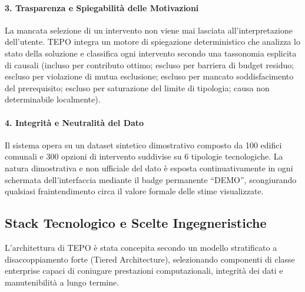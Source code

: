 \paragraph{3. Trasparenza e Spiegabilità delle Motivazioni}
La mancata selezione di un intervento non viene mai lasciata all'interpretazione dell'utente. TEPO integra un motore di spiegazione deterministico che analizza lo stato della soluzione e classifica ogni intervento secondo una tassonomia esplicita di causali (incluso per contributo ottimo; escluso per barriera di budget residuo; escluso per violazione di mutua esclusione; escluso per mancato soddisfacimento del prerequisito; escluso per saturazione del limite di tipologia; causa non determinabile localmente).

\paragraph{4. Integrità e Neutralità del Dato}
Il sistema opera su un dataset sintetico dimostrativo composto da 100 edifici comunali e 300 opzioni di intervento suddivise su 6 tipologie tecnologiche. La natura dimostrativa e non ufficiale del dato è esposta continuativamente in ogni schermata dell'interfaccia mediante il badge permanente ``DEMO'', scongiurando qualsiasi fraintendimento circa il valore formale delle stime visualizzate.

\subsection{Stack Tecnologico e Scelte Ingegneristiche}
L'architettura di TEPO è stata concepita secondo un modello stratificato a disaccoppiamento forte (Tiered Architecture), selezionando componenti di classe enterprise capaci di coniugare prestazioni computazionali, integrità dei dati e manutenibilità a lungo termine.

